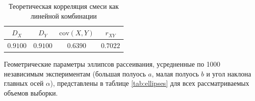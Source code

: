 \documentclass[a4paper, 14pt]{extarticle}
\begin{document}
\begin{table}[H]
    \centering
    \caption{Теоретическая корреляция смеси как линейной комбинации}
    \label{tab:mixture_theory}
    \begin{tabular}{|c|c|c|c|}
        \hline
        $D_X$ & $D_Y$ & $\mathrm{cov}(X,Y)$ & $r_{XY}$ \\ \hline
        $0.9100$ & $0.9100$ & $0.6390$ & $0.7022$ \\ \hline
    \end{tabular}
\end{table}

Геометрические параметры эллипсов рассеивания, усредненные по 1000 независимым экспериментам (большая полуось $a$, малая полуось $b$ и угол наклона главных осей $\alpha$), представлены в таблице \ref{tab:ellipses} для всех рассматриваемых объемов выборки.
\end{document}
